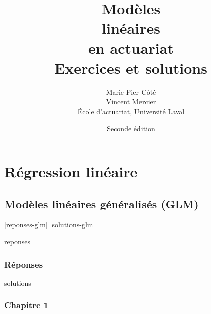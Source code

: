 \documentclass[letterpaper,10pt]{memoir}\usepackage[]{graphicx}\usepackage[]{color}
\title{\HUGE
    \fontseries{ub}\selectfont Modèles \\
    \fontseries{ub}\selectfont linéaires\\
    \fontseries{ub}\selectfont en actuariat \\[0.5\baselineskip]
    \huge\fontseries{m}\selectfont Exercices et solutions}
\author{\LARGE Marie-Pier Côté \\[3mm]
          \LARGE Vincent Mercier \\[3mm]
    \large École d'actuariat, Université Laval}
\date{\large Seconde édition}
\begin{document}

\frontmatter

\pagestyle{empty}


\pagestyle{companion}



\cleardoublepage
\tableofcontents*

\mainmatter

\part{Régression linéaire}






\chapter{Modèles linéaires généralisés (GLM)}
\label{chap:glm}

[reponses-glm]
[solutions-glm]

\begin{Filesave}{reponses}
\bigskip
\section*{Réponses}

\end{Filesave}

\begin{Filesave}{solutions}
\section*{Chapitre \ref{chap:glm}}

\end{Filesave}




\newcommand{\bm}{\boldmath}
\newcommand{\bobeta}{\mbox{\bm$\beta$}}
\end{document}
